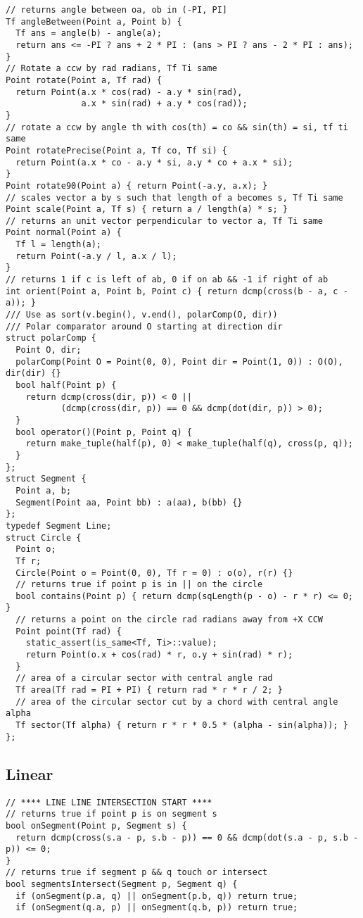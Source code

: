 \documentclass[FSZ,a4paper,onesided]{article}
\begin{document}
\begin{multicols*}{\COLS}
\begin{lstlisting}
// returns angle between oa, ob in (-PI, PI]
Tf angleBetween(Point a, Point b) {
  Tf ans = angle(b) - angle(a);
  return ans <= -PI ? ans + 2 * PI : (ans > PI ? ans - 2 * PI : ans);
}
// Rotate a ccw by rad radians, Tf Ti same
Point rotate(Point a, Tf rad) {
  return Point(a.x * cos(rad) - a.y * sin(rad),
               a.x * sin(rad) + a.y * cos(rad));
}
// rotate a ccw by angle th with cos(th) = co && sin(th) = si, tf ti same
Point rotatePrecise(Point a, Tf co, Tf si) {
  return Point(a.x * co - a.y * si, a.y * co + a.x * si);
}
Point rotate90(Point a) { return Point(-a.y, a.x); }
// scales vector a by s such that length of a becomes s, Tf Ti same
Point scale(Point a, Tf s) { return a / length(a) * s; }
// returns an unit vector perpendicular to vector a, Tf Ti same
Point normal(Point a) {
  Tf l = length(a);
  return Point(-a.y / l, a.x / l);
}
// returns 1 if c is left of ab, 0 if on ab && -1 if right of ab
int orient(Point a, Point b, Point c) { return dcmp(cross(b - a, c - a)); }
/// Use as sort(v.begin(), v.end(), polarComp(O, dir))
/// Polar comparator around O starting at direction dir
struct polarComp {
  Point O, dir;
  polarComp(Point O = Point(0, 0), Point dir = Point(1, 0)) : O(O), dir(dir) {}
  bool half(Point p) {
    return dcmp(cross(dir, p)) < 0 ||
           (dcmp(cross(dir, p)) == 0 && dcmp(dot(dir, p)) > 0);
  }
  bool operator()(Point p, Point q) {
    return make_tuple(half(p), 0) < make_tuple(half(q), cross(p, q));
  }
};
struct Segment {
  Point a, b;
  Segment(Point aa, Point bb) : a(aa), b(bb) {}
};
typedef Segment Line;
struct Circle {
  Point o;
  Tf r;
  Circle(Point o = Point(0, 0), Tf r = 0) : o(o), r(r) {}
  // returns true if point p is in || on the circle
  bool contains(Point p) { return dcmp(sqLength(p - o) - r * r) <= 0; }
  // returns a point on the circle rad radians away from +X CCW
  Point point(Tf rad) {
    static_assert(is_same<Tf, Ti>::value);
    return Point(o.x + cos(rad) * r, o.y + sin(rad) * r);
  }
  // area of a circular sector with central angle rad
  Tf area(Tf rad = PI + PI) { return rad * r * r / 2; }
  // area of the circular sector cut by a chord with central angle alpha
  Tf sector(Tf alpha) { return r * r * 0.5 * (alpha - sin(alpha)); }
};
\end{lstlisting}
\subsection{Linear}
\begin{lstlisting}
// **** LINE LINE INTERSECTION START ****
// returns true if point p is on segment s
bool onSegment(Point p, Segment s) {
  return dcmp(cross(s.a - p, s.b - p)) == 0 && dcmp(dot(s.a - p, s.b - p)) <= 0;
}
// returns true if segment p && q touch or intersect
bool segmentsIntersect(Segment p, Segment q) {
  if (onSegment(p.a, q) || onSegment(p.b, q)) return true;
  if (onSegment(q.a, p) || onSegment(q.b, p)) return true;


\end{lstlisting}
\end{multicols*}
\end{document}
